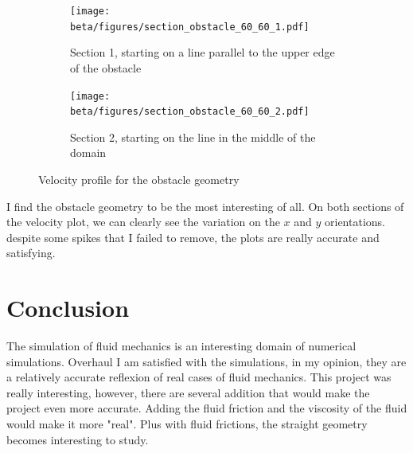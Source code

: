 \newpage
\begin{figure}[htbp]
      \centering
      \begin{subfigure}{.45\textwidth}
            \centering
            \texttt{[image: beta/figures/section\_obstacle\_60\_60\_1.pdf]}
            \caption{Section 1, starting on a line parallel to the upper edge
            of the obstacle}   
      \end{subfigure}
      \begin{subfigure}{.45\textwidth}
            \centering
            \texttt{[image: beta/figures/section\_obstacle\_60\_60\_2.pdf]}
            \caption{Section 2, starting on the line in the middle of the
            domain}   
      \end{subfigure}
      \caption{Velocity profile for the obstacle geometry}
\end{figure}

I find the obstacle geometry to be the most interesting of all. On both
sections of the velocity plot, we can clearly see the variation on the $x$ and
$y$ orientations. despite some spikes that I failed to remove, the plots are
really accurate and satisfying.

\part{Conclusion}
The simulation of fluid mechanics is an interesting domain of numerical
simulations. Overhaul I am satisfied with the simulations, in my opinion, they
are a relatively accurate reflexion of real cases of fluid mechanics. This
project was really interesting, however, there are several addition that would
make the project even more accurate. Adding the fluid friction and the
viscosity of the fluid would make it more "real". Plus with fluid frictions,
the straight geometry becomes interesting to study.
\newpage
\begin{multicols}{2}
    [\center{\printbibheading}]
    \printbibliography[heading=none]
\end{multicols}
\newpage

